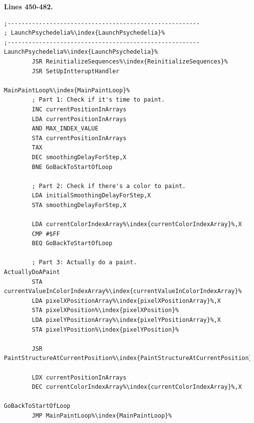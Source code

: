 \clearpage
\textbf{Lines 450-482. }
\begin{lstlisting}[caption= The game's main loop.,escapechar=\%]
;-------------------------------------------------------
; LaunchPsychedelia%\index{LaunchPsychedelia}%
;-------------------------------------------------------
LaunchPsychedelia%\index{LaunchPsychedelia}%   
        JSR ReinitializeSequences%\index{ReinitializeSequences}%
        JSR SetUpIntteruptHandler

MainPaintLoop%\index{MainPaintLoop}%   
        ; Part 1: Check if it's time to paint.
        INC currentPositionInArrays
        LDA currentPositionInArrays
        AND MAX_INDEX_VALUE
        STA currentPositionInArrays
        TAX 
        DEC smoothingDelayForStep,X
        BNE GoBackToStartOfLoop

        ; Part 2: Check if there's a color to paint.
        LDA initialSmoothingDelayForStep,X
        STA smoothingDelayForStep,X

        LDA currentColorIndexArray%\index{currentColorIndexArray}%,X
        CMP #$FF
        BEQ GoBackToStartOfLoop

        ; Part 3: Actually do a paint.
ActuallyDoAPaint
        STA currentValueInColorIndexArray%\index{currentValueInColorIndexArray}%
        LDA pixelXPositionArray%\index{pixelXPositionArray}%,X
        STA pixelXPosition%\index{pixelXPosition}%
        LDA pixelYPositionArray%\index{pixelYPositionArray}%,X
        STA pixelYPosition%\index{pixelYPosition}%

        JSR PaintStructureAtCurrentPosition%\index{PaintStructureAtCurrentPosition}%

        LDX currentPositionInArrays
        DEC currentColorIndexArray%\index{currentColorIndexArray}%,X

GoBackToStartOfLoop   
        JMP MainPaintLoop%\index{MainPaintLoop}%

\end{lstlisting}

